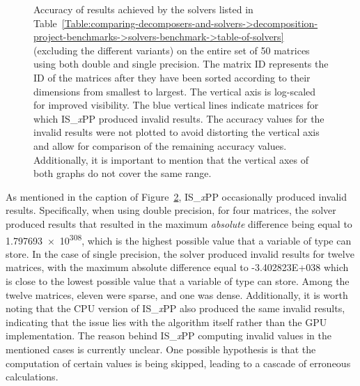\begin{figure}[ht!]
\begin{subfigure}{\textwidth}
		\label{Figure:comparing-decomposers-and-solvers->decomposition-project-benchmarks->solvers-benchmark->accuracy-of-results-on-all-matrices->single-precision}
	\end{subfigure}
	\caption{Accuracy of results achieved by the solvers listed in Table~\ref{Table:comparing-decomposers-and-solvers->decomposition-project-benchmarks->solvers-benchmark->table-of-solvers} (excluding the different variants) on the entire set of 50 matrices using both double and single precision.
		The matrix ID represents the ID of the matrices after they have been sorted according to their dimensions from smallest to largest.
		The vertical axis is log-scaled for improved visibility.
		The blue vertical lines indicate matrices for which IS\_\textit{x}PP produced invalid results.
		The accuracy values for the invalid results were not plotted to avoid distorting the vertical axis and allow for comparison of the remaining accuracy values.
		Additionally, it is important to mention that the vertical axes of both graphs do not cover the same range.
	}
	\label{Figure:comparing-decomposers-and-solvers->decomposition-project-benchmarks->solvers-benchmark->accuracy-of-results-on-all-matrices->double-and-single-precision}
\end{figure}

As mentioned in the caption of Figure~\ref{Figure:comparing-decomposers-and-solvers->decomposition-project-benchmarks->solvers-benchmark->accuracy-of-results-on-all-matrices->double-and-single-precision}, IS\_\textit{x}PP occasionally produced invalid results.
Specifically, when using double precision, for four matrices, the solver produced results that resulted in the maximum \textit{absolute} difference being equal to \num{1.797693e+308}, which is the highest possible value that a variable of type  can store.
In the case of single precision, the solver produced invalid results for twelve matrices, with the maximum absolute difference equal to \num{-3.402823E+038} which is close to the lowest possible value that a variable of type  can store.
Among the twelve matrices, eleven were sparse, and one was dense.
Additionally, it is worth noting that the CPU version of IS\_\textit{x}PP also produced the same invalid results, indicating that the issue lies with the algorithm itself rather than the GPU implementation.
The reason behind IS\_\textit{x}PP computing invalid values in the mentioned cases is currently unclear.
One possible hypothesis is that the computation of certain values is being skipped, leading to a cascade of erroneous calculations.

